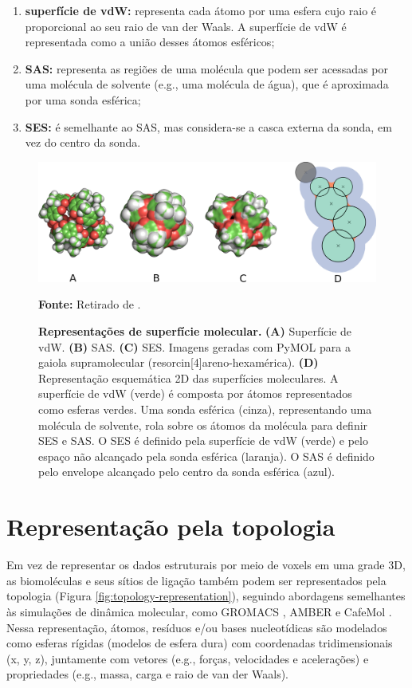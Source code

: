 \documentclass[Portugues]{phdquali}
\def\eg{e.g.\onedot}
\begin{document}
\begin{enumerate}[label=\textbf{(\Alph*)}]
  \item \textbf{superfície de vdW:} representa cada átomo por uma esfera cujo raio é proporcional ao seu raio de van der Waals. A superfície de vdW é representada como a união desses átomos esféricos; 
  \item \textbf{SAS:} representa as regiões de uma molécula que podem ser acessadas por uma molécula de solvente (\eg, uma molécula de água), que é aproximada por uma sonda esférica;
  \item \textbf{SES:} é semelhante ao SAS, mas considera-se a casca externa da sonda, em vez do centro da sonda.
\end{enumerate}

\begin{figure}[ht]
  \centerline{\includegraphics[scale=0.8]{images/surface-representation.png}}
  \centerline{\scriptsize{\textbf{Fonte:} Retirado de \cite{guerra2023B}.}}
  \caption[Representações de superfície molecular]{\textbf{Representações de superfície molecular.} \textbf{(A)} Superfície de vdW. \textbf{(B)} SAS. \textbf{(C)} SES. Imagens geradas com PyMOL para a gaiola supramolecular (resorcin[4]areno-hexamérica). \textbf{(D)} Representação esquemática 2D das superfícies moleculares. A superfície de vdW (verde) é composta por átomos representados como esferas verdes. Uma sonda esférica (cinza), representando uma molécula de solvente, rola sobre os átomos da molécula para definir SES e SAS. O SES é definido pela superfície de vdW (verde) e pelo espaço não alcançado pela sonda esférica (laranja). O SAS é definido pelo envelope alcançado pelo centro da sonda esférica (azul).}
  \label{fig:surface-representation}
\end{figure}

\section{Representação pela topologia}

Em vez de representar os dados estruturais por meio de voxels em uma grade 3D, as biomoléculas e seus sítios de ligação também podem ser representados pela topologia (Figura \ref{fig:topology-representation}), seguindo abordagens semelhantes às simulações de dinâmica molecular, como GROMACS \cite{gromacs}, AMBER \cite{amber} e CafeMol \cite{kenzaki2011}. Nessa representação, átomos, resíduos e/ou bases nucleotídicas são modelados como esferas rígidas (modelos de esfera dura) com coordenadas tridimensionais (x, y, z), juntamente com vetores (\eg, forças, velocidades e acelerações) e propriedades (\eg, massa, carga e raio de van der Waals).
\end{document}
